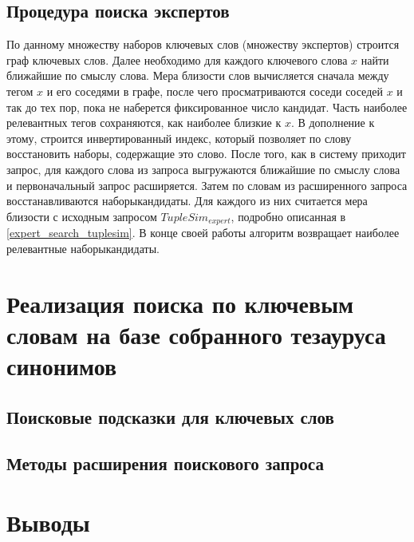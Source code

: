 \subsection{Процедура поиска экспертов}
По данному множеству наборов ключевых слов (множеству экспертов) строится граф ключевых слов. Далее необходимо для каждого ключевого слова $x$ найти ближайшие по смыслу слова. Мера близости слов вычисляется сначала между тегом $x$ и его соседями в графе, после чего просматриваются соседи соседей $x$ и так до тех пор, пока не наберется фиксированное число кандидат. Часть наиболее релевантных тегов сохраняются, как наиболее близкие к $x$. В дополнение к этому, строится инвертированный индекс, который позволяет по слову восстановить наборы, содержащие это слово. После того, как в систему приходит запрос, для каждого слова из запроса выгружаются ближайшие по смыслу слова и первоначальный запрос расширяется. Затем по словам из расширенного запроса восстанавливаются наборы­кандидаты. Для каждого из них считается мера близости с исходным запросом $TupleSim_{expert}$, подробно описанная в \ref{expert_search_tuplesim}. В конце своей работы алгоритм возвращает наиболее релевантные наборы­кандидаты.
\section{Реализация поиска по ключевым словам на базе собранного тезауруса синонимов}
\subsection{Поисковые подсказки для ключевых слов}
\subsection{Методы расширения поискового запроса}
\section{Выводы}

